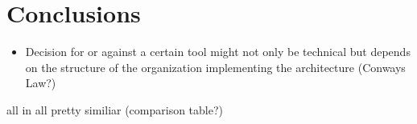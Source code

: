 \section{Conclusions}

\begin{itemize}
\item Decision for or against a certain tool might not only be technical but depends on the structure of the organization implementing the architecture (Conways Law?)
\end{itemize}

all in all pretty similiar (comparison table?)


